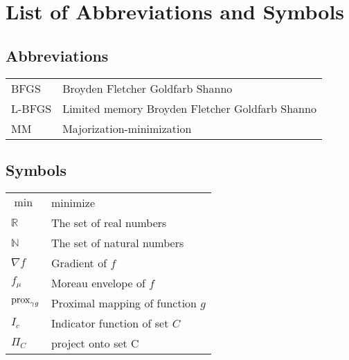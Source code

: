 \chapter{List of Abbreviations and Symbols}
\section*{Abbreviations}
\begin{flushleft}
  \renewcommand{\arraystretch}{1.1}
  \begin{tabularx}{\textwidth}{@{}p{18mm}X@{}}
  	BFGS   		& Broyden Fletcher Goldfarb Shanno \\
   	L-BFGS   	& Limited memory Broyden Fletcher Goldfarb Shanno \\
   	MM     		& Majorization-minimization
  \end{tabularx}
\end{flushleft}
\section*{Symbols}
\begin{flushleft}
  \renewcommand{\arraystretch}{1.1}
  \begin{tabularx}{\textwidth}{@{}p{12mm}X@{}}
    $\min$    & minimize \\
    $\mathbb{R}$   & The set of real numbers \\
    $\mathbb{N}$   & The set of natural numbers \\
    $\nabla f$     & Gradient of $f$ \\
    $f_{\mu}$      & Moreau envelope of $f$ \\
    $\operatorname{prox}_{\gamma g}$ & Proximal mapping of function $g$ \\
    $I_c$          & Indicator function of set $C$ \\
    $\Pi_C$		   & project onto set C
  \end{tabularx}
\end{flushleft}